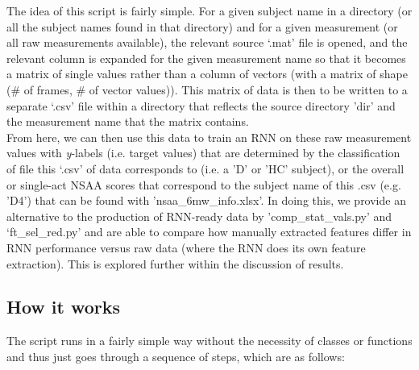 \documentclass[12pt,twoside]{report}
\begin{document}
\quad The idea of this script is fairly simple. For a given subject name in a directory (or all the subject names found in that directory) and for a given measurement (or all raw measurements available), the relevant source ‘.mat’ file is opened, and the relevant column is expanded for the given measurement name so that it becomes a matrix of single values rather than a column of vectors (with a matrix of shape (\# of frames, \# of vector values)). This matrix of data is then to be written to a separate ‘.csv’ file within a directory that reflects the source directory 'dir' and the measurement name that the matrix contains.\\

\quad From here, we can then use this data to train an RNN on these raw measurement values with \textit{y}-labels (i.e. target values) that are determined by the classification of file this ‘.csv’ of data corresponds to (i.e. a 'D' or 'HC' subject), or the overall or single-act NSAA scores that correspond to the subject name of this .csv (e.g. 'D4') that can be found with 'nsaa\_6mw\_info.xlsx'. In doing this, we provide an alternative to the production of RNN-ready data by 'comp\_stat\_vals.py' and ‘ft\_sel\_red.py’ and are able to compare how manually extracted features differ in RNN performance versus raw data (where the RNN does its own feature extraction). This is explored further within the discussion of results.

\subsection{How it works}

\quad The script runs in a fairly simple way without the necessity of classes or functions and thus just goes through a sequence of steps, which are as follows:
\end{document}
